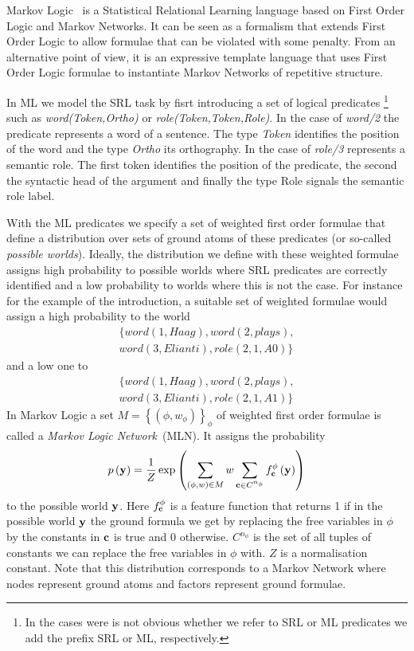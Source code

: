Markov Logic~\citep[ML,][]{richardson05markov} is a Statistical Relational 
Learning language based on First Order Logic and Markov Networks. It can be seen 
as a formalism that extends First Order Logic to allow formulae that can be 
violated with some penalty. From an alternative point of view, it is an 
expressive template language that uses First Order Logic formulae to instantiate
Markov Networks of repetitive structure. 

In ML we model the SRL task by fisrt introducing a set of logical predicates  
\footnote{In the cases were is not obvious whether we refer to SRL or ML 
predicates we add the prefix SRL or ML, respectively.} such as 
\emph{word(Token,Ortho)} or \emph{role(Token,Token,Role)}. In the case of 
\emph{word/2} the predicate represents a word of a sentence. The type 
\emph{Token} identifies the position of the word and the type \emph{Ortho} its 
orthography. In the case of \emph{role/3} represents a semantic role. The first 
token identifies the position of the predicate, the second the syntactic head of 
the argument and finally the type Role signals the semantic role label.

With the ML predicates we specify a set of weighted first order formulae that 
define a distribution over sets of ground atoms of these predicates (or 
so-called \emph{possible worlds}). Ideally, the distribution we define with 
these weighted formulae assigns high probability to possible worlds where SRL 
predicates are correctly identified and a low probability to worlds where this 
is not the case. For instance for the example of the introduction, a suitable 
set of weighted formulae would assign a high probability to the world
\begin{eqnarray*}
 &\{ word\left(1,Haag\right),word(2,plays),\\
 & word(3,Elianti),role(2,1,A0) \}& \end{eqnarray*}
and a low one to
\begin{eqnarray*}
& \{ word\left(1,Haag\right),word(2,plays),\\
 & word(3,Elianti),role(2,1,A1) \} &\end{eqnarray*}
In Markov Logic a set $M=\left\{ \left(\phi,w_{\phi}\right)\right\} _{\phi}$ of 
weighted first order formulae is called a \emph{Markov Logic Network}~(MLN). It 
assigns the probability
\begin{equation}
p\left(\mathbf{y}\right)=\frac{1}{Z}\exp\left(
\sum_{\left(\phi,w\right)\in M} w
\sum_{\mathbf{c}\in C^{n_{\phi}}}f_{\mathbf{c}}^{\phi}\left(\mathbf{y}\right)
\right)
\label{eq:prob}
\end{equation}
to the possible world $\mathbf{y}$. Here $f_{\mathbf{c}}^{\phi}$ is a feature
function that returns 1 if in the possible world $\mathbf{y}$ the ground
formula we get by replacing the free variables in $\phi$ by the constants
in $\mathbf{c}$ is true and 0 otherwise. $C^{n_{\phi}}$ is the set
of all tuples of constants we can replace the free variables in $\phi$
with. $Z$ is a normalisation constant. Note that this distribution corresponds 
to a Markov Network where nodes represent ground atoms and factors represent 
ground formulae. 

